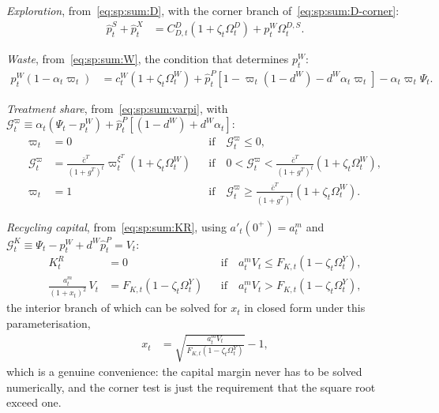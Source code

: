 \emph{Exploration}, from~\eqref{eq:sp:sum:D}, with the corner branch of~\eqref{eq:sp:sum:D-corner}:
\begin{align}
\hat p^S_t+\hat p^X_t &= C^D_{D,t}\left(1+\zeta_t\Omega^D_t\right)+p^W_t\Omega^{D,S}_t .
\label{eq:qsp:foc:D}
\end{align}

\emph{Waste}, from~\eqref{eq:sp:sum:W}, the condition that determines $p^W_t$:
\begin{align}
p^W_t\left(1-\alpha_t\varpi_t\right) &= c^W_t\left(1+\zeta_t\Omega^W_t\right)
+\hat p^P_t\left[1-\varpi_t\left(1-d^W\right)-d^W\alpha_t\varpi_t\right]-\alpha_t\varpi_t\Psi_t .
\label{eq:qsp:foc:W}
\end{align}

\emph{Treatment share}, from~\eqref{eq:sp:sum:varpi}, with
$\mathcal G^\varpi_t\equiv\alpha_t\left(\Psi_t-p^W_t\right)+\hat p^P_t\left[\left(1-d^W\right)+d^W\alpha_t\right]$:
\begin{subequations}
\label{eq:qsp:foc:varpi}
\begin{align}
\varpi_t &= 0
&&\text{if}\quad \mathcal G^\varpi_t\le0,
\\
\mathcal G^\varpi_t &= \frac{\bar c^T}{\left(1+g^T\right)^t}\varpi_t^{\xi^T}\left(1+\zeta_t\Omega^W_t\right)
&&\text{if}\quad 0<\mathcal G^\varpi_t<\frac{\bar c^T}{\left(1+g^T\right)^t}\left(1+\zeta_t\Omega^W_t\right),
\\
\varpi_t &= 1
&&\text{if}\quad \mathcal G^\varpi_t\ge\frac{\bar c^T}{\left(1+g^T\right)^t}\left(1+\zeta_t\Omega^W_t\right).
\end{align}
\end{subequations}

\emph{Recycling capital}, from~\eqref{eq:sp:sum:KR}, using $a'_t\!\left(0^+\right)=a^m_t$
and $\mathcal G^K_t\equiv\Psi_t-p^W_t+d^W\hat p^P_t=V_t$:
\begin{subequations}
\label{eq:qsp:foc:KR}
\begin{align}
K^R_t &= 0
&&\text{if}\quad a^m_tV_t\le F_{K,t}\left(1-\zeta_t\Omega^Y_t\right),
\\
\frac{a^m_t}{\left(1+x_t\right)^2}\,V_t &= F_{K,t}\left(1-\zeta_t\Omega^Y_t\right)
&&\text{if}\quad a^m_tV_t> F_{K,t}\left(1-\zeta_t\Omega^Y_t\right),
\end{align}
\end{subequations}
the interior branch of which can be solved for $x_t$ in closed form under this parameterisation,
\begin{align}
x_t &= \sqrt{\frac{a^m_tV_t}{F_{K,t}\left(1-\zeta_t\Omega^Y_t\right)}}-1 ,
\label{eq:qsp:x-closed-form}
\end{align}
which is a genuine convenience: the capital margin never has to be solved numerically, and the corner
test is just the requirement that the square root exceed one.

